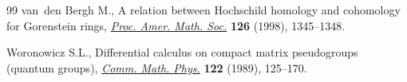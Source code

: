 \documentclass[pdftex]{sigma}
\numberwithin{equation}{section}
\begin{document}
\begin{thebibliography}{99}
van~den Bergh M., A relation between {H}ochschild homology and cohomology for
 {G}orenstein rings, \href{https://doi.org/10.1090/S0002-9939-98-04210-5}{\textit{Proc. Amer. Math. Soc.}} \textbf{126} (1998),
 1345--1348.

Woronowicz S.L., Differential calculus on compact matrix pseudogroups (quantum
 groups), \href{https://doi.org/10.1007/BF01221411}{\textit{Comm. Math. Phys.}} \textbf{122} (1989), 125--170.

\end{thebibliography}\LastPageEnding
\end{document}
